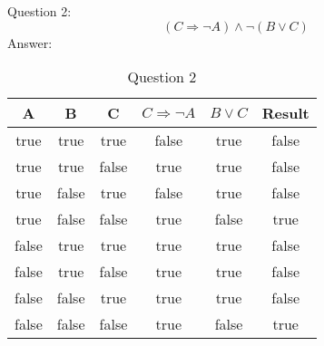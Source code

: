 \documentclass[12pt, a4paper]{report}
\begin{document}
Question 2:
\begin{equation}
    (C \Rightarrow \neg A) \wedge \neg (B \vee C)
\end{equation}
Answer:
\begin{table}[h]
    \centering
    \caption{Question 2}
    \begin{tabular}{|c|c|c|c|c|c|}
    \hline
    A & B & C & $C \Rightarrow \neg A$ & $B \vee C$ & Result \\
    \hline
    true & true & true & false & true & false \\
    \hline
    true & true & false & true & true & false \\
    \hline
    true & false & true & false & true & false \\
    \hline
    true & false & false & true & false & true \\
    \hline
    false & true & true & true & true & false \\
    \hline
    false & true & false & true & true & false \\
    \hline
    false & false & true & true & true & false \\
    \hline
    false & false & false & true & false & true \\
    \hline
    \end{tabular}
\end{table}
\end{document}
